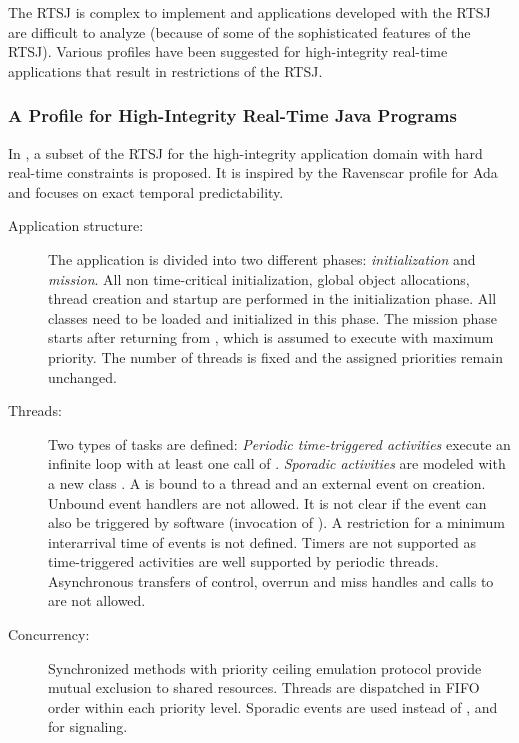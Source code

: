 The RTSJ is complex to implement and applications developed with the
RTSJ are difficult to analyze (because of some of the sophisticated
features of the RTSJ). Various profiles have been suggested for
high-integrity real-time applications that result in restrictions of
the RTSJ.

\subsubsection{A Profile for High-Integrity Real-Time Java Programs}


In \cite{Pusch01}, a subset of the RTSJ for the high-integrity
application domain with hard real-time constraints is proposed. It
is inspired by the Ravenscar profile for Ada \cite{289525} and
focuses on exact temporal predictability.
%
\begin{description}
\item[Application structure:] The application is divided into two
    different phases: \textit{initialization} and
    \textit{mission}. All non time-critical initialization,
    global object allocations, thread creation and startup are
    performed in the initialization phase. All classes need to be
    loaded and initialized in this phase. The mission phase
    starts after returning from , which is assumed
    to execute with maximum priority. The number of threads is
    fixed and the assigned priorities remain unchanged.

\item[Threads:] Two types of tasks are defined: \textit{Periodic
time-triggered activities} execute an infinite loop with at least
one call of . \textit{Sporadic activities}
are modeled with a new class . A
 is bound to a thread and an external event on
creation. Unbound event handlers are not allowed. It is not clear if
the event can also be triggered by software (invocation of
). A restriction for a minimum interarrival time of
events is not defined. Timers are not supported as time-triggered
activities are well supported by periodic threads. Asynchronous
transfers of control, overrun and miss handles and calls to
 are not allowed.

\item[Concurrency:] Synchronized methods with priority ceiling emulation protocol
provide mutual exclusion to shared resources. Threads are dispatched
in FIFO order within each priority level. Sporadic events are used
instead of ,  and  for
signaling.


\end{description}
